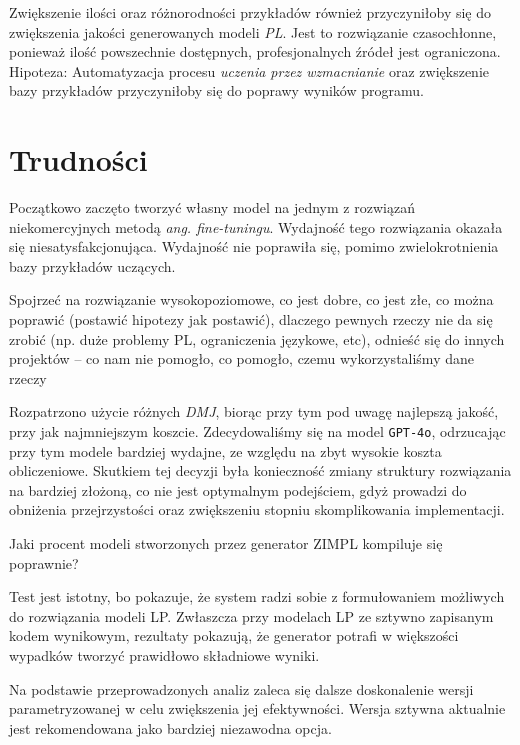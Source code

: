 Zwiększenie ilości oraz różnorodności przykładów również przyczyniłoby się do zwiększenia jakości generowanych modeli \textit{PL}. Jest to rozwiązanie czasochłonne, ponieważ ilość powszechnie dostępnych, profesjonalnych źródeł jest ograniczona.
Hipoteza: Automatyzacja procesu \textit{uczenia przez wzmacnianie} oraz zwiększenie bazy przykładów przyczyniłoby się do poprawy wyników programu.

\section{Trudności}

Początkowo zaczęto tworzyć własny model na jednym z rozwiązań niekomercyjnych metodą \textit{ang. fine-tuningu}. Wydajność tego rozwiązania okazała się niesatysfakcjonująca. Wydajność nie poprawiła się, pomimo zwielokrotnienia bazy przykładów uczących.

Spojrzeć na rozwiązanie wysokopoziomowe, co jest dobre, co jest złe, co można poprawić (postawić hipotezy jak postawić), dlaczego pewnych rzeczy nie da się zrobić (np. duże problemy PL, ograniczenia językowe, etc), odnieść się do innych projektów – co nam nie pomogło, co pomogło, czemu wykorzystaliśmy dane rzeczy

Rozpatrzono użycie różnych \textit{DMJ}, biorąc przy tym pod uwagę najlepszą jakość, przy jak najmniejszym koszcie. Zdecydowaliśmy się na model \texttt{GPT-4o}, odrzucając przy tym modele bardziej wydajne, ze względu na zbyt wysokie koszta obliczeniowe. Skutkiem tej decyzji była konieczność zmiany struktury rozwiązania na bardziej złożoną, co nie jest optymalnym podejściem, gdyż prowadzi do obniżenia przejrzystości oraz zwiększeniu stopniu skomplikowania implementacji.


Jaki procent modeli stworzonych przez generator ZIMPL
kompiluje się poprawnie?

Test jest istotny, bo pokazuje, że system radzi sobie z formułowaniem możliwych do rozwiązania modeli LP. Zwłaszcza przy modelach LP ze sztywno zapisanym kodem wynikowym, rezultaty pokazują, że generator potrafi w większości wypadków tworzyć prawidłowo składniowe wyniki. %

Na podstawie przeprowadzonych analiz zaleca się dalsze doskonalenie wersji parametryzowanej w celu zwiększenia jej efektywności. Wersja sztywna aktualnie jest rekomendowana jako bardziej niezawodna opcja.